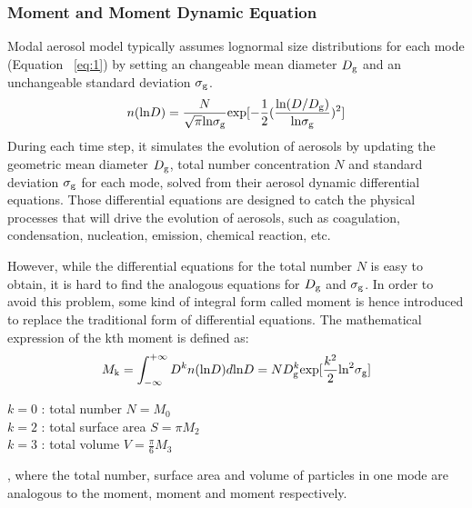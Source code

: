 \documentclass[12pt]{article}
\begin{document}
	\subsubsection{Moment and Moment Dynamic Equation}
		Modal aerosol model typically assumes lognormal size distributions for each mode (Equation ~\ref{eq:1}) by setting an changeable mean diameter $D_{\rm g}$ and an unchangeable standard deviation $\sigma_{\rm g}$. 
		\begin{align}\label{eq:1}
		n(\text{ln}D) = \frac{N}{\sqrt{\pi}\text{ln}\sigma_{\rm g}}\text{exp}[-\frac{1}{2}(\frac{\text{ln}(D/D_{\rm g})}{\text{ln}\sigma_{\rm g}})^2]
		\end{align}
		During each time step, it simulates the evolution of aerosols by updating the geometric mean diameter $D_{\rm g}$, total number concentration $N$ and standard deviation $\sigma_{\rm g}$ for each mode, solved from their aerosol dynamic differential equations. Those differential equations are designed to catch the physical processes that will drive the evolution of aerosols, such as coagulation, condensation, nucleation, emission, chemical reaction, etc.
	
		 However, while the differential equations for the total number $N$ is easy to obtain, it is hard to find the analogous equations for $D_{\rm g}$ and $\sigma_{\rm g}$. In order to avoid this problem, some kind of integral form called moment is hence introduced to replace the traditional form of differential equations. The mathematical expression of the kth moment is defined as:
	 \begin{align}
	 M_\text{k} = \int_{-\infty}^{+\infty}D^kn(\text{ln}D)d\text{ln}D = ND_{\rm g}^k\text{exp}[\frac{k^2}{2}\text{ln}^2\sigma_{\rm g}]
	 \end{align}
	 \begin{flushleft}
	 	$k = 0$ : total number $N = M_0$ \\
	 	$k = 2$ : total surface area $S = \pi M_2$ \\
	 	$k = 3$ : total volume $V = \frac{\pi}{6}M_3$ \\
	 \end{flushleft}
	, where the total number, surface area and volume of particles in one mode are analogous to the  moment,  moment and  moment respectively. 
	
\end{document}

